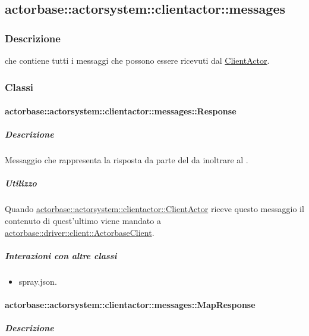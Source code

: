 \documentclass{scalatekids-article}
\begin{document}
\subsection{actorbase::actorsystem::clientactor::messages}
\label{sec:actorbase::actorsystem::clientactor::messages}

\subsubsection{Descrizione}

 che contiene tutti i messaggi che possono essere ricevuti dal
\hyperref[sec:actorbase::actorsystem::clientactor::ClientActor]{ClientActor}.

\subsubsection{Classi}

\paragraph{actorbase::actorsystem::clientactor::messages::Response}
\label{sec:actorbase::actorsystem::clientactor::messages::Response}

\subparagraph{Descrizione}

Messaggio che rappresenta la risposta da parte del  da inoltrare
al .

\subparagraph{Utilizzo}

Quando \hyperref[sec:actorbase::actorsystem::clientactor::ClientActor]{actorbase::actorsystem::clientactor::ClientActor}
riceve questo messaggio il contenuto di quest'ultimo viene
mandato a \hyperref[sec:actorbase::driver::client::ActorbaseClient]{actorbase::driver::\allowbreak{}client::\allowbreak{}ActorbaseClient}.

\subparagraph{Interazioni con altre classi}

\begin{itemize}
\item spray.json.
\end{itemize}

\paragraph{actorbase::actorsystem::clientactor::messages::MapResponse}
\label{sec:actorbase::actorsystem::clientactor::messages::MapResponse}

\subparagraph{Descrizione}
\end{document}
